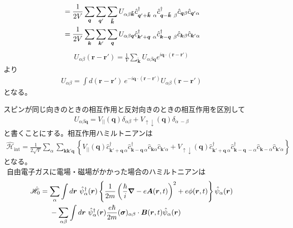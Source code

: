 \documentclass[dvipdfmx, 11pt, a4paper]{jsarticle}
\theoremstyle{definition}
\numberwithin{equation}{section}
\begin{document}
\begin{derivationBox}
\begin{align}
            &= \frac{1}{2V} \sum_{\bm{q}}\sum_{\bm{q}'}\sum_{\bm{\tilde{k}}}     U_{\alpha \beta\bm{\tilde{k}}}\hat{c}^\dagger_{\bm{q}'+\bm{\tilde{k}}\ \alpha}\hat{c}^\dagger_{\bm{q}-\bm{\tilde{k}}\ \beta}\hat{c}_{\bm{q}\beta} \hat{c}_{\bm{q}'\alpha}\notag \\
            &= \frac{1}{2V} \sum_{\bm{k}}\sum_{\bm{k}'}\sum_{\bm{q}}     U_{\alpha \beta\bm{q}}\hat{c}^\dagger_{\bm{k}'+\bm{q}\ \alpha}\hat{c}^\dagger_{\bm{k}-\bm{q}\ \beta}\hat{c}_{\bm{k}\beta} \hat{c}_{\bm{k}'\alpha}\notag \\
        \end{align}
        \begin{align}
            U_{\alpha \beta} (\bm{r}-\bm{r}') = \frac{1}{V}\sum_{\bm{\tilde{k}}} U_{\alpha \beta \bm{q}}e^{i\bm{q}\cdot(\bm{r}-\bm{r}')}
        \end{align}
        より
        \begin{align}
            U_{\alpha\beta}=\int d(\bm{r}-\bm{r}')\ e^{-i\bm{q}\cdot(\bm{r}-\bm{r}')} U_{\alpha \beta}(\bm{r}-\bm{r}')
        \end{align}
        となる。
    \end{derivationBox}
    スピンが同じ向きのときの相互作用と反対向きのときの相互作用を区別して
    \begin{align}
        U_{\alpha \beta \bm{q}} = V_{||}(\bm{q}) \delta_{\alpha \beta} + V_{\uparrow \downarrow}(\bm{q})\delta_{\alpha\ -\beta}
    \end{align}
    と書くことにする。相互作用ハミルトニアンは
    \begin{align}
        \hat{\mathscr{H}}_{\text{int}} =  \frac{1}{2\sqrt{V}}\sum_{\alpha} \sum_{\bm{k}\bm{k}'\bm{q}} \left\{V_{||}(\bm{q}) \hat{c}^\dagger_{\bm{k}'+\bm{q}\ \alpha} \hat{c}^\dagger_{\bm{k}-\bm{q}\ \alpha}\hat{c}_{\bm{k} \alpha}\hat{c}_{\bm{k}' \alpha} + V_{\uparrow \downarrow}(\bm{q})\hat{c}^\dagger_{\bm{k}'+\bm{q}\ \alpha} \hat{c}^\dagger_{\bm{k}-\bm{q}\ -\alpha}\hat{c}_{\bm{k} -\alpha}\hat{c}_{\bm{k}' \alpha} \right\}
    \end{align}
    となる。\\
    $\ \ $自由電子ガスに電場・磁場がかかった場合のハミルトニアンは
    \begin{align}
    \hat{\mathscr{H}}_0 &= \sum_{\alpha} \int d\bm{r}\ \hat{\psi}_\alpha^\dagger(\bm{r}) \left\{ \frac{1}{2m}\left( \frac{\hbar}{i}\bm{\nabla}-e\bm{A}(\bm{r},t) \right)^2 + e\phi(\bm{r},t) \right\}\hat{\psi}_\alpha(\bm{r}) \notag \\
    &\ \ \ \ -\sum_{\alpha \beta} \int d\bm{r}\ \hat{\psi}^\dagger_{\alpha}(\bm{r}) \frac{e\hbar}{2m} (\bm{\sigma})_{\alpha\beta}\cdot\bm{B}(\bm{r},t) \hat{\psi}_\alpha(\bm{r}) \label{DenjiHamiruDain}
    \end{align}
\end{document}
